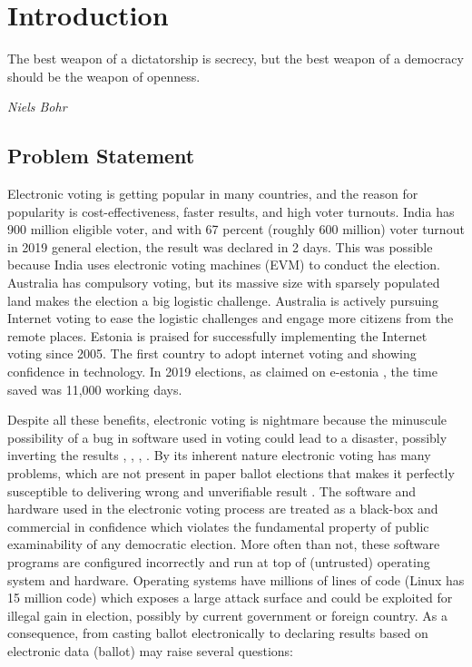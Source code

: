\chapter{Introduction}
\label{cha:intro}

\epigraph{The best weapon of a dictatorship is secrecy, but the best weapon of a democracy should be the weapon of openness.} 
{\textit{Niels Bohr}} 

\section{Problem Statement}
	Electronic voting is getting popular in many countries, and the reason for popularity is 
	cost-effectiveness, faster results, and high voter turnouts. India has 900 million eligible voter, 
   and with 67 percent (roughly 600 million) voter turnout in 2019 general election, 
   the result was declared in 2 days. This was possible because India uses  electronic 
   voting machines (EVM) to conduct the election. Australia has 
   compulsory voting, but its massive size with sparsely populated land makes 
   the election a big logistic challenge.  Australia is actively pursuing Internet voting 
   to ease the logistic challenges and engage more citizens from the remote places. Estonia
   is praised for successfully implementing the Internet voting since 2005. The first country to
   adopt internet voting and showing confidence in technology. In 2019 elections, 
   as claimed on e-estonia \citep{Estonia},  the time saved was 11,000 working days. 
   
   Despite all these benefits, electronic voting is nightmare because the minuscule possibility of 
   a bug in software used in voting could lead to a disaster, possibly 
   inverting the results \citep{TSwiss},
   \citep{10.1007/978-3-319-22270-7_3}, \citep{ARANHA2019335},
   \citep{Feldman:2007:SAD:1323111.1323113}. 
   By its inherent nature electronic voting has many 
   problems, which are not present in paper ballot elections that makes it perfectly susceptible 
   to delivering wrong and unverifiable result  \citep{Wolchok:2010:SAI:1866307.1866309}.
   The software and hardware used in the electronic voting process  
	are treated as a black-box and commercial in confidence \citep{AEC:2013:LMM} which  
	violates the fundamental property of  public examinability of any democratic election. 
	More often than not, these software programs are configured incorrectly \citep{1301313} and 
	run at top of (untrusted) operating system and hardware.  Operating systems have
	millions of lines of code (Linux has 15 million code) which exposes a large attack surface 
	and could be  exploited for illegal gain in election, possibly by 
	current government or foreign country.  As a consequence,  from casting ballot electronically to declaring 
	results based on electronic data (ballot) may raise several questions:
	
